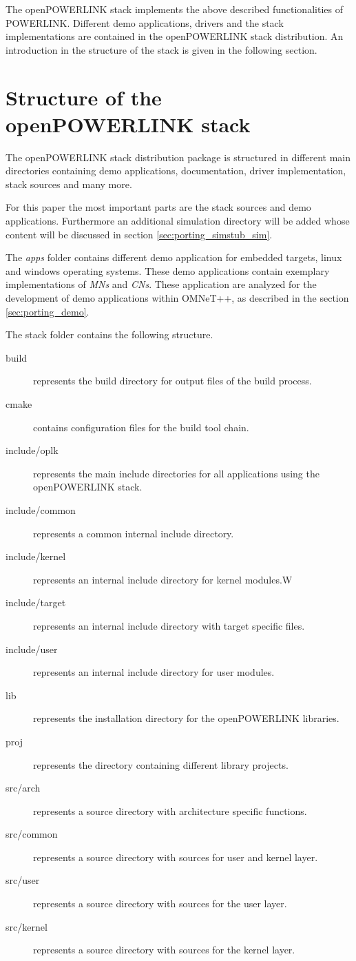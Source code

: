 The openPOWERLINK stack implements the above described functionalities of POWERLINK.
Different demo applications, drivers and the stack implementations are contained in the openPOWERLINK stack distribution.
An introduction in the structure of the stack is given in the following section.


\section{Structure of the openPOWERLINK stack}
\label{sec:oplk_structure}
The openPOWERLINK stack distribution package is structured in different main directories containing demo applications, documentation, driver implementation, stack sources and many more.

For this paper the most important parts are the stack sources and demo applications.
Furthermore an additional simulation directory will be added whose content will be discussed in section \ref{sec:porting_simstub_sim}.

The \emph{apps} folder contains different demo application for embedded targets, linux and windows operating systems.
These demo applications contain exemplary implementations of \emph{MNs} and \emph{CNs}.
These application are analyzed for the development of demo applications within OMNeT++, as described in the section \ref{sec:porting_demo}.

The stack folder contains the following structure. \cite[Directory Structure]{openpowerlink_doc}
\begin{description}
    \item[build] represents the build directory for output files of the build process.
    \item[cmake] contains configuration files for the build tool chain.
    \item[include/oplk] represents the main include directories for all applications using the openPOWERLINK stack.
    \item[include/common] represents a common internal include directory.
    \item[include/kernel] represents an internal include directory for kernel modules.W
    \item[include/target] represents an internal include directory with target specific files.
    \item[include/user] represents an internal include directory for user modules.
    \item[lib] represents the installation directory for the openPOWERLINK libraries.
    \item[proj] represents the directory containing different library projects.
    \item[src/arch] represents a source directory with architecture specific functions.
    \item[src/common] represents a source directory with sources for user and kernel layer.
    \item[src/user] represents a source directory with sources for the user layer.
    \item[src/kernel] represents a source directory with sources for the kernel layer.
\end{description}

